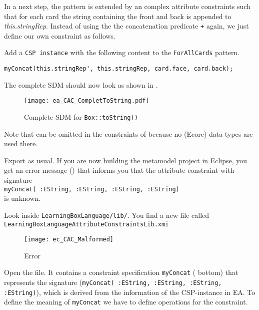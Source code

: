 In a next step, the pattern  is extended by an complex attribute constraints such that for each card the string containing the front and back is appended to \emph{this.stringRep}.  	 
Instead of using the the concatenation predicate \texttt{+} again, we just define our own constraint as follows.
\begin{stepbystep}
\item 
Add a \texttt{CSP instance} with the following content to the \texttt{ForAllCards} pattern.
\begin{verbatim}
myConcat(this.stringRep', this.stringRep, card.face, card.back);
\end{verbatim}
The complete SDM should now look as shown in .
%
\begin{figure}[htbp]
\begin{center}
  \texttt{[image: ea\_CAC\_CompletToString.pdf]}
  \caption{Complete SDM for \texttt{Box::toString()}}  
  \label{ea_CAC_CompletToString}
\end{center}
\end{figure}
%
Note that  can be omitted in the constraints of  because no (Ecore) data types are used there.
%
\item
Export as usual.
If you are now building the metamodel project in Eclipse, you get an error message () that informs you that the attribute constraint with signature \\
\hspace*{0.5cm} \texttt{\small myConcat( :EString, :EString, :EString, :EString)} \\
is unknown.

\item
Look inside \texttt{LearningBoxLanguage/lib/}.
You find a new file called \texttt{LearningBoxLanguageAttributeConstraintsLib.xmi} 
 
\begin{figure}[htbp]
\begin{center}
  \texttt{[image: ec\_CAC\_Malformed]}
  \caption{Error}  
  \label{ec_CAC_Malformed}
\end{center}
\end{figure}



\item
Open the file.
It contains a constraint specification \texttt{myConcat} ( bottom) that represents the signature (\texttt{\small myConcat( :EString, :EString, :EString, :EString)}), which is derived from the information of the CSP-instance in EA.
To define the meaning of \texttt{myConcat} we have to define operations for the constraint.


\end{stepbystep}

